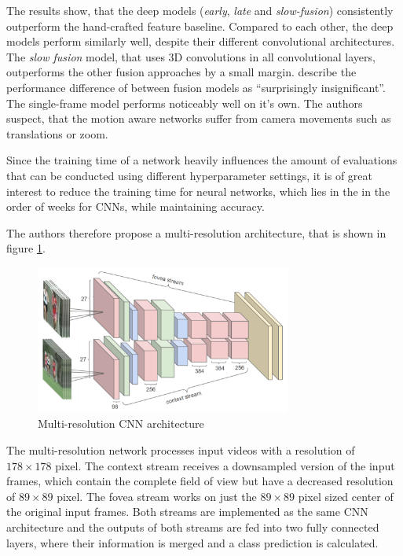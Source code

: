The results show, that the deep models (\textit{early}, \textit{late} and \textit{slow-fusion}) consistently outperform the hand-crafted feature baseline.
Compared to each other, the deep models perform similarly well, despite their different convolutional architectures.
The \textit{slow fusion} model, that uses 3D convolutions in all convolutional layers, outperforms the other fusion approaches by a small margin.
\textcite{karpathy_large-scale_2014} describe the performance difference of between fusion models as ``surprisingly insignificant''\cite{karpathy_large-scale_2014}.
The single-frame model performs noticeably well on it's own.
The authors suspect, that the motion aware networks suffer from camera movements such as translations or zoom.

Since the training time of a network heavily influences the amount of evaluations that can be conducted using different hyperparameter settings, it is of great interest to reduce the training time for neural networks, which lies in the in the order of weeks for CNNs\cite{karpathy_large-scale_2014}, while maintaining accuracy.

The authors therefore propose a multi-resolution architecture, that is shown in figure \ref{fig:largescale_multiresolution}.
\begin{figure}[H]
    \centering
    \includegraphics[width=0.75\textwidth]{img_deep/largescale_multiresolution.png}
    \caption{Multi-resolution CNN architecture \cite{karpathy_large-scale_2014}}
    \label{fig:largescale_multiresolution}
\end{figure}

The multi-resolution network processes input videos with a resolution of $178\times178$ pixel.
The context stream receives a downsampled version of the input frames, which contain the complete field of view but have a decreased resolution of $89\times89$ pixel.
The fovea stream works on just the $89\times89$ pixel sized center of the original input frames.
Both streams are implemented as the same CNN architecture and the outputs of both streams are fed into two fully connected layers, where their information is merged and a class prediction is calculated.

